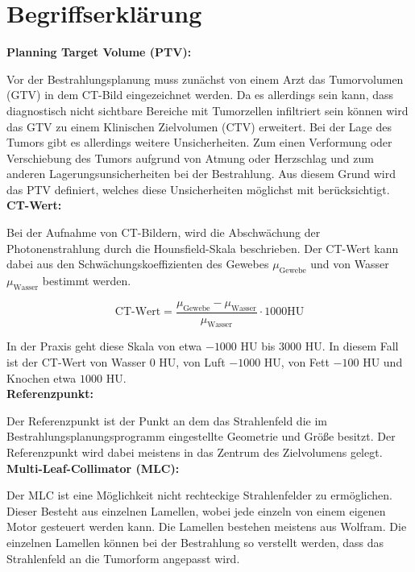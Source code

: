 \section{Begriffserklärung}\label{Begriffe}

\textbf{Planning Target Volume (PTV):}

Vor der Bestrahlungsplanung muss zunächst von einem Arzt das Tumorvolumen (GTV)
in dem CT-Bild eingezeichnet werden. Da es allerdings sein kann, dass diagnostisch
nicht sichtbare Bereiche mit Tumorzellen infiltriert sein können wird das GTV zu
einem Klinischen Zielvolumen (CTV) erweitert. Bei der Lage des Tumors gibt es
allerdings weitere Unsicherheiten.
Zum einen Verformung oder Verschiebung des Tumors aufgrund von Atmung oder Herzschlag und
zum anderen Lagerungsunsicherheiten bei der Bestrahlung. Aus diesem Grund wird
das PTV definiert, welches diese Unsicherheiten möglichst mit berücksichtigt. \cite{grundlagen}\\

\textbf{CT-Wert:}

Bei der Aufnahme von CT-Bildern, wird die Abschwächung der Photonenstrahlung durch
die Hounsfield-Skala beschrieben. Der CT-Wert kann dabei aus den Schwächungskoeffizienten
des Gewebes $\mu_\text{Gewebe}$ und von Wasser $\mu_\text{Wasser}$ bestimmt werden.

\begin{equation*}
  \text{CT-Wert} = \frac{\mu_\text{Gewebe} - \mu_\text{Wasser}}{\mu_\text{Wasser}} \cdot 1000 \text{HU}
\end{equation*}

In der Praxis geht diese Skala von etwa $-1000$ HU bis $3000$ HU. In diesem Fall ist der
CT-Wert von Wasser $0$ HU, von Luft $-1000$ HU, von Fett $-100$ HU und Knochen etwa $1000$ HU. \cite{HU}\\

\textbf{Referenzpunkt:}

Der Referenzpunkt ist der Punkt an dem das Strahlenfeld die im Bestrahlungsplanungsprogramm
eingestellte Geometrie und Größe besitzt. Der Referenzpunkt wird dabei meistens in
das Zentrum des Zielvolumens gelegt. \cite{grundlagen}\\

\textbf{Multi-Leaf-Collimator (MLC):}

Der MLC ist eine Möglichkeit nicht rechteckige Strahlenfelder zu ermöglichen.
Dieser Besteht aus einzelnen Lamellen, wobei jede einzeln von einem eigenen Motor
gesteuert werden kann. Die Lamellen bestehen meistens aus Wolfram.
Die einzelnen Lamellen können bei der Bestrahlung so verstellt werden, dass das
Strahlenfeld an die Tumorform angepasst wird. \cite{grundlagen}\\

